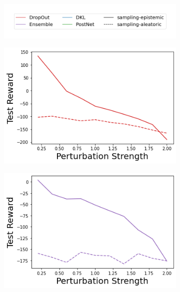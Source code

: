 \begin{figure}
    \centering
    \begin{subfigure}{.45\textwidth}
        \includegraphics[width=\textwidth]{sections/011_icml2022/resources/sampling-legend.png}
    \end{subfigure}
    \vspace{-3mm}
    
    \begin{subfigure}{.245\textwidth}
        \includegraphics[width=\textwidth]{sections/011_icml2022/resources/action_shift-DropOut-LunarLanderShift-v0-mean_reward_.png}
    \end{subfigure}
    \begin{subfigure}{.245\textwidth}
        \includegraphics[width=\textwidth]{sections/011_icml2022/resources/action_shift-Ensemble-LunarLanderShift-v0-mean_reward_.png}

\end{subfigure}
\end{figure}
